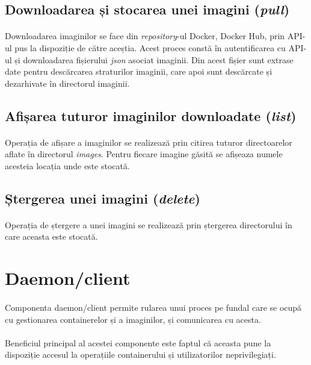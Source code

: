         \subsection{Downloadarea și stocarea unei imagini (\textit{pull})}
            \paragraph{} Downloadarea imaginilor se face din \textit{repository}-ul Docker, Docker Hub, prin API-ul pus la dispoziție de către aceștia. Acest proces constă în autentificarea cu API-ul și downloadarea fișierului \textit{json} asociat imaginii. Din acest fișier sunt extrase date pentru descărcarea straturilor imaginii, care apoi sunt descărcate și dezarhivate în directorul imaginii.

        \subsection{Afișarea tuturor imaginilor downloadate (\textit{list})}
            \paragraph{} Operația de afișare a imaginilor se realizează prin citirea tuturor directoarelor aflate în directorul \textit{images}. Pentru fiecare imagine găsită se afișeaza numele acesteia locația unde este stocată.

        \subsection{Ștergerea unei imagini (\textit{delete})}
        \paragraph{} Operația de ștergere a unei imagini se realizează prin ștergerea directorului în care aceasta este stocată.

    \section{Daemon/client}
        \paragraph{} Componenta daemon/client permite rularea unui proces pe fundal care se ocupă cu gestionarea containerelor și a imaginilor, și comunicarea cu acesta.
        \paragraph{} Beneficiul principal al acestei componente este faptul că aceasta pune la dispoziție accesul la operațiile containerului și utilizatorilor neprivilegiați.
